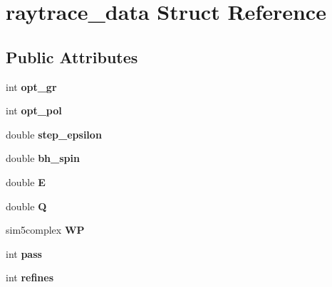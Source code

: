 \hypertarget{structraytrace__data}{}\section{raytrace\+\_\+data Struct Reference}
\label{structraytrace__data}
\subsection*{Public Attributes}
\begin{DoxyCompactItemize}
\item 
\mbox{\label{structraytrace__data_a41d740d38a2b2bf95ded6a067bfde1b3}} 
int {\bfseries opt\+\_\+gr}
\item 
\mbox{\label{structraytrace__data_aa3d131dd5141e11e7655f8714b8ce3c6}} 
int {\bfseries opt\+\_\+pol}
\item 
\mbox{\label{structraytrace__data_af300d122734a7f02f195554e7f753ad3}} 
double {\bfseries step\+\_\+epsilon}
\item 
\mbox{\label{structraytrace__data_a215e9c1bd1bd18b8b2bc6ed455f4d4f8}} 
double {\bfseries bh\+\_\+spin}
\item 
\mbox{\label{structraytrace__data_a803dee4ffcfdf3e3e02b5767f56fe414}} 
double {\bfseries E}
\item 
\mbox{\label{structraytrace__data_af7163b1fcea630e558d18631e9b22a25}} 
double {\bfseries Q}
\item 
\mbox{\label{structraytrace__data_ac20ab27a763e2ad8ad758aaad0d314fc}} 
sim5complex {\bfseries WP}
\item 
\mbox{\label{structraytrace__data_ac01f20658d3d9ec398d6bf0dc5217501}} 
int {\bfseries pass}
\item 
\mbox{\label{structraytrace__data_a979eabc422c789e32f77bbf597b4d38e}} 
int {\bfseries refines}
\item 
\mbox{\label{structraytrace__data_aff3e3f1ef0b3252a1006e93d5137b372}} 

\end{DoxyCompactItemize}
